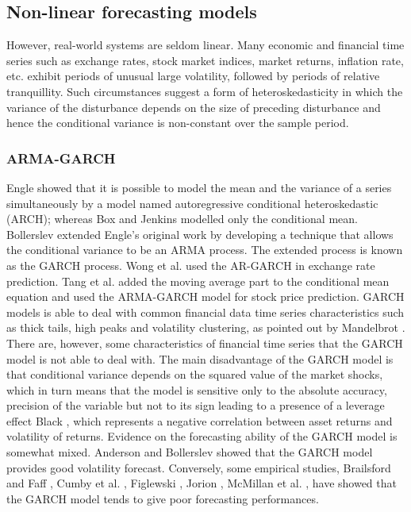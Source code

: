 \subsection{Non-linear forecasting models}

However, real-world systems are seldom linear. Many economic and financial time series such as exchange rates, stock market indices, market returns, inflation rate, etc. exhibit periods of unusual large volatility, followed by periods of relative tranquillity. Such circumstances suggest a form of heteroskedasticity in which the variance of the disturbance depends on the size of preceding disturbance and hence the conditional variance is non-constant over the sample period. 

\subsubsection{ARMA-GARCH}

Engle \cite{Engel} showed that it is possible to model the mean and the variance of a series simultaneously by a model named autoregressive conditional heteroskedastic (ARCH); whereas Box and Jenkins \cite{B&J} modelled only the conditional mean. Bollerslev \cite{Bollerslev} extended Engle’s \cite{Engel} original work by developing a technique that allows the conditional variance to be an ARMA process. The extended process is known as the GARCH process. Wong et al. \cite{Wetal} used the AR-GARCH in exchange rate prediction. Tang et al. \cite{Tetal} added the moving average part to the conditional mean equation and used the ARMA-GARCH model for stock price prediction. GARCH models is able to deal with common financial data time series characteristics such as thick tails, high peaks and volatility clustering, as pointed out by Mandelbrot \cite{Mandelbrot}. There are, however, some characteristics of financial time series that the GARCH model is not able to deal with. The main disadvantage of the GARCH model is that conditional variance depends on the squared value of the market shocks, which in turn means that the model is sensitive only to the absolute accuracy, precision of the variable but not to its sign leading to a presence of a leverage effect Black \cite{Black}, which represents a negative correlation between asset returns and volatility of returns. Evidence on the forecasting ability of the GARCH model is somewhat mixed. Anderson and Bollerslev \cite{A&B} showed that the GARCH model provides good volatility forecast. Conversely, some empirical studies, Brailsford and Faff \cite{f1}, Cumby et al. \cite{f2}, Figlewski \cite{f3},  Jorion \cite{f4}\cite{f5}, McMillan et al. \cite{f6}, have showed that the GARCH model tends to give poor forecasting performances. 

